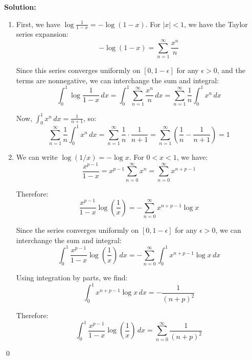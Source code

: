 \bigskip\noindent\textbf{Solution:}
\begin{enumerate}[label=(\alph*)]
\item First, we have $\log \frac{1}{1-x} = -\log(1-x)$. For $|x| < 1$, we have the Taylor series expansion:
\[-\log(1-x) = \sum_{n=1}^{\infty} \frac{x^n}{n}\]

Since this series converges uniformly on $[0, 1-\epsilon]$ for any $\epsilon > 0$, and the terms are nonnegative, we can interchange the sum and integral:
\[\int_{0}^{1} \log \frac{1}{1-x} \, dx = \int_{0}^{1} \sum_{n=1}^{\infty} \frac{x^n}{n} \, dx = \sum_{n=1}^{\infty} \frac{1}{n} \int_{0}^{1} x^n \, dx\]

Now, $\int_{0}^{1} x^n \, dx = \frac{1}{n+1}$, so:
\[\sum_{n=1}^{\infty} \frac{1}{n} \int_{0}^{1} x^n \, dx = \sum_{n=1}^{\infty} \frac{1}{n} \cdot \frac{1}{n+1} = \sum_{n=1}^{\infty} \left(\frac{1}{n} - \frac{1}{n+1}\right) = 1\]

\item We can write $\log(1/x) = -\log x$. For $0 < x < 1$, we have:
\[\frac{x^{p-1}}{1-x} = x^{p-1} \sum_{n=0}^{\infty} x^n = \sum_{n=0}^{\infty} x^{n+p-1}\]

Therefore:
\[\frac{x^{p-1}}{1-x} \log \left( \frac{1}{x} \right) = -\sum_{n=0}^{\infty} x^{n+p-1} \log x\]

Since the series converges uniformly on $[0, 1-\epsilon]$ for any $\epsilon > 0$, we can interchange the sum and integral:
\[\int_{0}^{1} \frac{x^{p-1}}{1-x} \log \left( \frac{1}{x} \right) \, dx = -\sum_{n=0}^{\infty} \int_{0}^{1} x^{n+p-1} \log x \, dx\]

Using integration by parts, we find:
\[\int_{0}^{1} x^{n+p-1} \log x \, dx = -\frac{1}{(n+p)^2}\]

Therefore:
\[\int_{0}^{1} \frac{x^{p-1}}{1-x} \log \left( \frac{1}{x} \right) \, dx = \sum_{n=0}^{\infty} \frac{1}{(n+p)^2}\]
\end{enumerate}\qed


